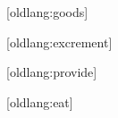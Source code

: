 \renewcommand{\DictionaryHeadwordFormat}[1]{\textbf{*\textit{#1}}}
\renewcommand{\DictionaryWordFormat}[1]{*\textit{#1}}

\begin{multicols*}{2}

    [oldlang:goods]
    \begin{senses}
    \end{senses}

    [oldlang:excrement]
    \begin{senses}
    \end{senses}

    [oldlang:provide]
    \begin{senses}
    \end{senses}

    [oldlang:eat]
    \begin{senses}
    \end{senses}

\end{multicols*}